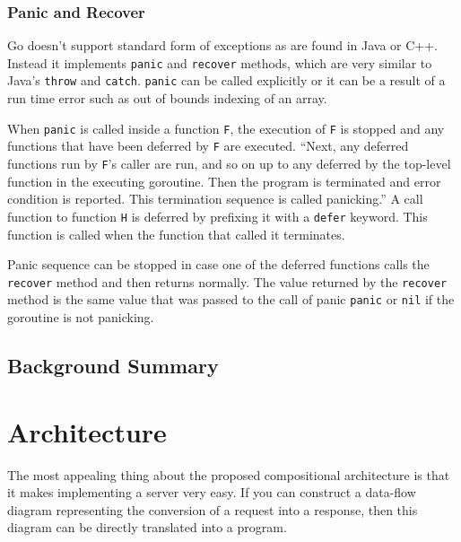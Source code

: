 \documentclass[12pt,a4paper]{article}
\begin{document}
\subsubsection{Panic and Recover}
Go doesn't support standard form of exceptions as are found in Java or
C++. Instead it implements \texttt{panic} and \texttt{recover} methods, 
which are very similar to Java's \texttt{throw} and \texttt{catch}.
\texttt{panic} can be called explicitly or it can be a result of 
a run time error such as out of bounds indexing of an array.

When \texttt{panic} is called inside a function \texttt{F}, the execution
of \texttt{F} is stopped and any functions that have been deferred by
\texttt{F} are executed. ``Next, any deferred functions run by \texttt{F}'s caller 
are run, and so on up to any deferred by the top-level function in the executing 
goroutine. Then the program is terminated and error condition 
is reported. This termination sequence is called panicking.'' \cite{goSpec}
A call function to function \texttt{H} is deferred by prefixing it with a 
\texttt{defer} keyword. This function is called when the function that 
called it terminates.

Panic sequence can be stopped in case one of the deferred functions
calls the \texttt{recover} method and then returns normally. The value
returned by the \texttt{recover} method is the same value that was passed
to the call of panic \texttt{panic} or \texttt{nil} if the goroutine
is not panicking. \cite{goSpec}

\subsection{Background Summary}



\newpage
\section{Architecture}
\label{sec:arch}
The most appealing thing about the proposed compositional architecture is that
it makes implementing a server very easy. If you can construct a data-flow diagram 
representing the conversion of a request into a response, then this diagram
can be directly translated into a program.
\end{document}
